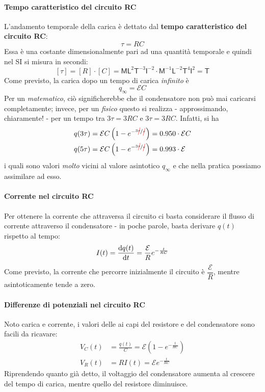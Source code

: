 \paragraph{Tempo caratteristico del circuito RC}
L'andamento temporale della carica è dettato dal \textbf{tempo caratteristico del circuito RC}:
\begin{equation}
	\tau=RC
\end{equation}
Essa è una costante dimensionalmente pari ad una quantità temporale e quindi nel SI si misura in secondi:
\begin{equation*}
	\left[\tau\right]=\left[R\right]\cdot\left[C\right]=\mathsf{M} \mathsf{L}^2  \mathsf{T}^{-3}\mathsf{I}^{-2}\cdot\mathsf{M}^{-1}\mathsf{L}^{-2}\mathsf{T}^4\mathsf{I}^2=\mathsf{T}
\end{equation*}
Come previsto, la carica dopo un tempo di carica \textit{infinito} è
\begin{equation}
	q_{\infty}=\mathcal{E}C
\end{equation}
Per un \textit{matematico}, ciò significherebbe che il condensatore non può mai caricarsi completamente; invece, per un \textit{fisico} questo si realizza - approssimando, chiaramente! - per un tempo tra $3\tau=3RC$ e $3\tau=3RC$. Infatti, si ha
\begin{align*}
q(3\tau)&=\mathcal{E}C\left(1-e^{-\nicefrac{3\Ccancel[red]{\tau}}{\Ccancel[red]{\tau}}}\right)=\num{0.950}\cdot\mathcal{E}C\\
q(5\tau)&=\mathcal{E}C\left(1-e^{-\nicefrac{3\Ccancel[red]{\tau}}{\Ccancel[red]{\tau}}}\right)=\num{0.993}\cdot\mathcal{E}
\end{align*}
i quali sono valori \textit{molto} vicini al valore asintotico $q_{\infty}$ e che nella pratica possiamo assimilare ad esso.
\paragraph{Corrente nel circuito RC}
Per ottenere la corrente che attraversa il circuito ci basta considerare il flusso di corrente attraverso il condensatore - in poche parole, basta derivare $q(t)$ rispetto al tempo:
\begin{equation}
	I(t)=\dv{q(t)}{t}=\frac{\mathcal{E}}{R}e^{-\frac{t}{RC}}
\end{equation}
Come previsto, la corrente che percorre inizialmente il circuito è $\dfrac{\mathcal{E}}{R}$, mentre asintoticamente tende a zero.
\paragraph{Differenze di potenziali nel circuito RC}
Noto carica e corrente, i valori delle \ddp ai capi del resistore e del condensatore sono facili da ricavare:
\begin{align}
	V_C(t)&=\frac{q(t)}{C}=\mathcal{E}\left(1-e^{-\frac{t}{RC}}\right)\\
	V_R(t)&=RI(t)=\mathcal{E}e^{-\frac{t}{RC}}
\end{align}
Riprendendo quanto già detto, il voltaggio del condensatore aumenta al crescere del tempo di carica, mentre quello del resistore diminuisce.
